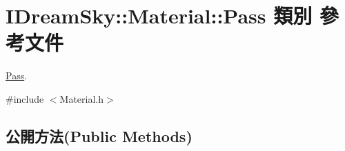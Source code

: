 \hypertarget{class_i_dream_sky_1_1_material_1_1_pass}{}\section{I\+Dream\+Sky\+:\+:Material\+:\+:Pass 類別 參考文件}
\label{class_i_dream_sky_1_1_material_1_1_pass}


\hyperlink{class_i_dream_sky_1_1_material_1_1_pass}{Pass}.  




{\ttfamily \#include $<$Material.\+h$>$}

\subsection*{公開方法(Public Methods)}

